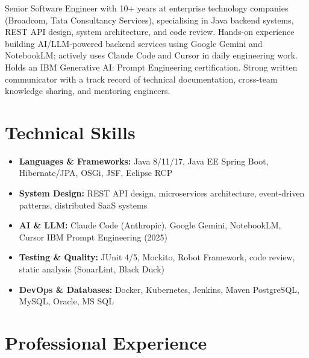 \documentclass[10pt,a4paper,sans]{moderncv}
\begin{document}
\makecvtitle
\vspace{-10pt}

\small{Senior Software Engineer with 10+ years at enterprise technology companies (Broadcom, Tata Consultancy Services), specialising in Java backend systems, REST API design, system architecture, and code review. Hands-on experience building AI/LLM-powered backend services using Google Gemini and NotebookLM; actively uses Claude Code and Cursor in daily engineering work. Holds an IBM Generative AI: Prompt Engineering certification. Strong written communicator with a track record of technical documentation, cross-team knowledge sharing, and mentoring engineers.}

\vspace{2pt}

\section{Technical Skills}
\vspace{1pt}
\begin{itemize}
  \item \textbf{Languages \& Frameworks:} Java 8/11/17, Java EE \textbar{} Spring Boot, Hibernate/JPA, OSGi, JSF, Eclipse RCP
  \item \textbf{System Design:} REST API design, microservices architecture, event-driven patterns, distributed SaaS systems
  \item \textbf{AI \& LLM:} Claude Code (Anthropic), Google Gemini, NotebookLM, Cursor \textbar{} IBM Prompt Engineering (2025)
  \item \textbf{Testing \& Quality:} JUnit 4/5, Mockito, Robot Framework, code review, static analysis (SonarLint, Black Duck)
  \item \textbf{DevOps \& Databases:} Docker, Kubernetes, Jenkins, Maven \textbar{} PostgreSQL, MySQL, Oracle, MS SQL
\end{itemize}

\section{Professional Experience}
\vspace{1pt}
\end{document}
